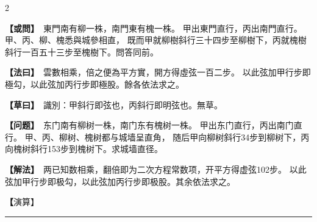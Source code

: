 \documentclass[11pt,a4paper]{article}
\newcommand{\longline}{\noindent\rule{\textwidth}{0.4pt}}
\newcommand{\clOWEN}[1]{%
  \par\vspace{0.3em}%
  \noindent\textcolor{problemcolor}{\textbf{【或問】}}\,{\tradfont #1}\par\nopagebreak%
}
\newcommand{\mdOWEN}[1]{%
  \par\vspace{0.3em}%
  \noindent\textcolor{problemcolor}{\textbf{【问题】}}\,{\modfont #1}\par\nopagebreak%
}
\newcommand{\clFAYUE}[1]{%
  \par\noindent\textcolor{methodcolor}{\textbf{【法曰】}}\,{\tradfont #1}\par\nopagebreak%
}
\newcommand{\mdFAYUE}[1]{%
  \par\noindent\textcolor{methodcolor}{\textbf{【解法】}}\,{\modfont #1}\par\nopagebreak%
}
\newcommand{\clTSAOYUE}[1]{%
  \par\noindent\textcolor{workcolor}{\textbf{【草曰】}}\,{\tradfont #1}\par%
}
\newcommand{\mdTSAOYUE}[1]{%
  \par\noindent\textcolor{workcolor}{\textbf【演算】}}\,{\modfont #1}\par%
\begin{document}
\begin{paracol}{2}

\begin{leftcolumn}
\clOWEN{%
東門南有柳一株，南門東有槐一株。
甲出東門直行，丙出南門直行。
甲、丙、柳、槐悉與城參相直，
既而甲就柳樹斜行三十四步至柳樹下，丙就槐樹斜行一百五十三步至槐樹下。問答同前。}

\clFAYUE{%
雲數相乘，倍之便為平方實，開方得虛弦一百二步。
以此弦加甲行步即極勾，以此弦加丙行步即極股。餘各依法求之。}

\clTSAOYUE{%
識別：甲斜行即弦也，丙斜行即明弦也。無草。}
\end{leftcolumn}

\switchcolumn

\begin{rightcolumn}
\mdOWEN{%
东门南有柳树一株，南门东有槐树一株。
甲出东门直行，丙出南门直行。
甲、丙、柳树、槐树都与城墙呈直角，
随后甲向柳树斜行34步到柳树下，丙向槐树斜行153步到槐树下。求城墙直径。}

\mdFAYUE{%
两已知数相乘，翻倍即为二次方程常数项，开平方得虚弦102步。
以此弦加甲行步即极勾，以此弦加丙行步即极股。其余依法求之。}

\mdTSAOYUE{%
辨识：甲斜行即弦，丙斜行即明弦。无演算草文。}
\end{rightcolumn}

\end{paracol}

\vspace{0.3cm}
\begin{center}\longline\end{center}
\end{document}
